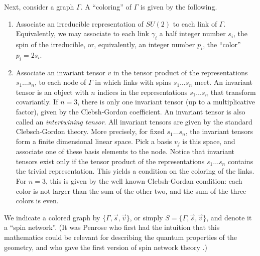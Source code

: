 \documentclass[12pt]{article}
\begin{document}
Next, consider a graph $\Gamma$. A ``coloring'' of $\Gamma$ is 
given by the following. 
\begin{enumerate}
 \item Associate an irreducible representation of $SU(2)$ to each 
 link of $\Gamma$.  Equivalently, we may associate to each link 
 $\gamma_{i}$ a half integer number $s_{i}$, the spin of the 
 irreducible, or, equivalently, an integer number $p_{i}$, the 
 ``color'' $p_{i} = 2s_{i}$.  
 
 \item Associate an invariant tensor $v$ in the tensor product of 
 the representations $s_{1}\ldots s_{n}$, to each node of $\Gamma$ 
 in which links with spins $s_{1}\ldots s_{n}$ meet.  An invariant 
 tensor is an object with $n$ indices in the representations 
 $s_{1}\ldots s_{n}$ that transform covariantly.  If $n=3$, there 
 is only one invariant tensor (up to a multiplicative factor), 
 given by the Clebsh-Gordon coefficient.  An invariant tensor is 
 also called an {\it intertwining tensor}.  All invariant tensors 
 are given by the standard Clebsch-Gordon theory.  More precisely, 
 for fixed $s_{1}\ldots s_{n}$, the invariant tensors form a 
 finite dimensional linear space.  Pick a basis $v_{j}$ is this 
 space, and associate one of these basis elements to the node.  
 Notice that invariant tensors exist only if the tensor product of 
 the representations $s_{1}\ldots s_{n}$ contains the trivial 
 representation.  This yields a condition on the coloring of the 
 links.  For $n=3$, this is given by the well known Clebsh-Gordan 
 condition: each color is not larger than the sum of the other 
 two, and the sum of the three colors is even.
\end{enumerate}
We indicate a colored graph by $\{\Gamma, \vec s, \vec v\}$, or 
simply $S=\{\Gamma, \vec s, \vec v\}$, and denote it a ``spin 
network''.  (It was Penrose who first had the intuition that this 
mathematics could be relevant for describing the quantum 
properties of the geometry, and who gave the first version of 
spin network theory \cite{Penrose2,Penrose}.)
\end{document}
